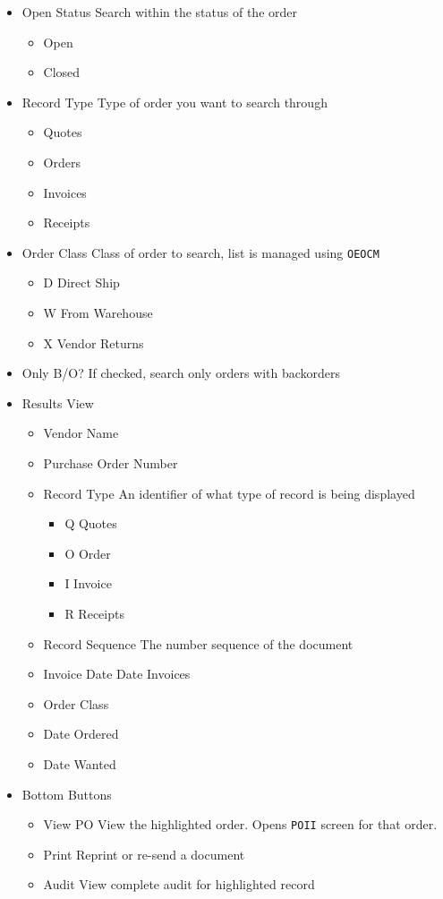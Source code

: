 \begin{itemize}
	\item Open Status \textemdash Search within the status of the order
	\begin{itemize}
		\item Open
		\item Closed
	\end{itemize}
	\item Record Type \textemdash Type of order you want to search through
	\begin{itemize}
		\item Quotes
		\item Orders
		\item Invoices
		\item Receipts
	\end{itemize}	
	\item Order Class \textemdash Class of order to search, list is managed using \texttt{OEOCM}
	\begin{itemize}
		\item D \textemdash Direct Ship
		\item W \textemdash From Warehouse
		\item X \textemdash Vendor Returns
	\end{itemize}
	\item Only B/O? \textemdash If checked, search only orders with backorders
	\item Results View
	\begin{itemize}
		\item Vendor Name
		\item Purchase Order Number
		\item Record Type \textemdash An identifier of what type of record is being displayed
		\begin{itemize}
			\item Q \textemdash Quotes
			\item O \textemdash Order
			\item I \textemdash Invoice
			\item R \textemdash Receipts
		\end{itemize}
		\item Record Sequence \textemdash The number sequence of the document
		\item Invoice Date \textemdash Date Invoices
		\item Order Class
		\item Date Ordered
		\item Date Wanted
	\end{itemize}
	\item Bottom Buttons
	\begin{itemize}
		\item View PO \textemdash View the highlighted order. Opens \texttt{POII} screen for that order.
		\item Print \textemdash Reprint or re-send a document
		\item Audit \textemdash View complete audit for highlighted record
	\end{itemize}
\end{itemize}

